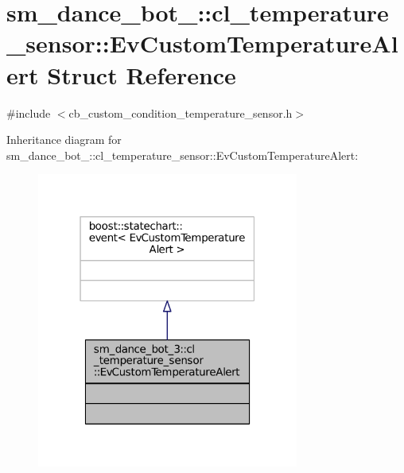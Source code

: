 \hypertarget{structsm__dance__bot__3_1_1cl__temperature__sensor_1_1EvCustomTemperatureAlert}{}\section{sm\+\_\+dance\+\_\+bot\+\_\+:\+:cl\+\_\+temperature\+\_\+sensor\+:\+:Ev\+Custom\+Temperature\+Alert Struct Reference}
\label{structsm__dance__bot__3_1_1cl__temperature__sensor_1_1EvCustomTemperatureAlert}


{\ttfamily \#include $<$cb\+\_\+custom\+\_\+condition\+\_\+temperature\+\_\+sensor.\+h$>$}



Inheritance diagram for sm\+\_\+dance\+\_\+bot\+\_\+:\+:cl\+\_\+temperature\+\_\+sensor\+:\+:Ev\+Custom\+Temperature\+Alert\+:
\nopagebreak
\begin{figure}[H]
\begin{center}
\leavevmode
\includegraphics[width=244pt]{structsm__dance__bot__3_1_1cl__temperature__sensor_1_1EvCustomTemperatureAlert__inherit__graph}
\end{center}
\end{figure}


